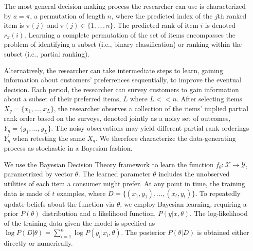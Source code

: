 \documentclass[a4paper,11pt]{article}
\newcommand{\numitems}{n}
\newcommand{\numperset}{L}
\begin{document}
The most general decision-making process the researcher can use is characterized by $a=\pi$, a permutation of length $\numitems$, where the predicted index of the $j$th ranked item is $\pi(j)$ and $\pi(j) \in \{1,\ldots,\numitems\}$. The predicted rank of item $i$ is denoted $r_\pi(i)$. Learning a complete permutation of the set of items encompasses the problem of identifying a subset (i.e., binary classification) or ranking within the subset (i.e., partial ranking). 

Alternatively, the researcher can take intermediate steps to learn, gaining information about customers' preferrences sequentially, to improve the eventual decision. Each period, the researcher can survey customers to gain information about a subset of their preferred items, $\numperset$ where $\numperset << \numitems$. After selecting items $X_q = \{ x_1,\ldots, x_\numperset \}$, the researcher observes a collection of the items' implied partial rank order based on the surveys, denoted jointly as a noisy set of outcomes, $Y_q = \{ y_1,\ldots, y_\numperset \}$. The noisy observations may yield different partial rank orderings $Y_q^{'}$ when retesting the same $X_q$. We therefore characterize the data-generating process as stochastic in a Bayesian fashion. 

%

We use the Bayesian Decision Theory framework to learn the function $f_\theta: \mathcal{X} \to \mathcal{Y}$, parametrized by vector $\theta$. The learned parameter $\theta$ includes the unobserved utilities of each item a consumer might prefer. At any point in time, the training data is made of $t$ examples, where $D = \{ (x_1,y_1),...,(x_t,y_t) \}$. To repeatedly update beliefs about the function via $\theta$, we employ Bayesian learning, requiring a prior $P(\theta)$ distribution and a likelihood function, $P(y|x,\theta)$. The log-likelihood of the training data given the model is specified as $\log P(D|\theta) = \sum_{i=1}^n \log P(y_i|x_i,\theta)$. The posterior $P(\theta|D)$ is obtained either directly or numerically.
\end{document}
